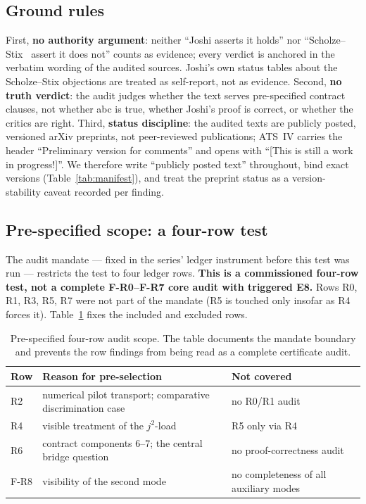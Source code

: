 \documentclass[11pt,a4paper]{article}
\begin{document}
\subsection{Ground rules}

First, \textbf{no authority argument}: neither ``Joshi asserts it holds'' nor
``Scholze--Stix~\cite{scholzestix} assert it does not'' counts as evidence;
every verdict is anchored in the verbatim wording of the audited sources.
Joshi's own status tables about the Scholze--Stix objections are treated as
self-report, not as evidence. Second, \textbf{no truth verdict}: the audit
judges whether the text serves pre-specified contract clauses, not whether
abc is true, whether Joshi's proof is correct, or whether the critics are
right. Third, \textbf{status discipline}: the audited texts are publicly
posted, versioned arXiv preprints, not peer-reviewed publications; ATS~IV
carries the header ``Preliminary version for comments'' and opens with
``[This is still a work in progress!]''. We therefore write ``publicly posted
text'' throughout, bind exact versions (Table~\ref{tab:manifest}), and treat
the preprint status as a version-stability caveat recorded per finding.

\subsection{Pre-specified scope: a four-row test}\label{sec:scope}

The audit mandate --- fixed in the series' ledger instrument before this test
was run --- restricts the test to four ledger rows. \textbf{This is a
commissioned four-row test, not a complete F-R0--F-R7 core audit
with triggered E8.} Rows R0, R1, R3, R5,
R7 were not part of the mandate (R5 is touched only insofar as R4 forces it).
Table~\ref{tab:audit-scope} fixes the included and excluded rows.

\begin{table}[htbp]
\centering\small
\begin{tabularx}{\textwidth}{@{}l >{\raggedright\arraybackslash}X l@{}}
\toprule
Row & Reason for pre-selection & Not covered \\
\midrule
R2 & numerical pilot transport; comparative discrimination case & no R0/R1 audit \\
R4 & visible treatment of the $j^2$-load & R5 only via R4 \\
R6 & contract components 6--7; the central bridge question & no proof-correctness audit \\
F-R8 & visibility of the second mode & no completeness of all auxiliary modes \\
\bottomrule
\end{tabularx}
\caption{Pre-specified four-row audit scope. The table documents the mandate
boundary and prevents the row findings from being read as a complete
certificate audit.}
\label{tab:audit-scope}
\end{table}
\end{document}

